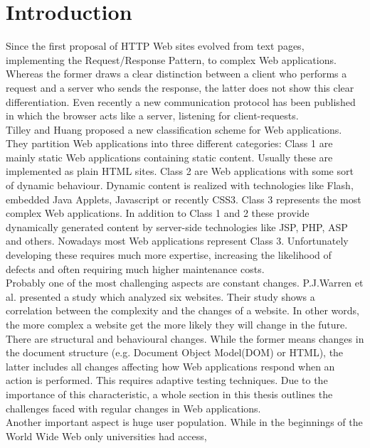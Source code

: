 \documentclass[12pt, notitlepage]{article}
\begin{document}
\section*{Introduction}
Since the first proposal of HTTP\cite{http-proposal} Web sites evolved from 
text pages, implementing the Request/Response Pattern\cite{request-response}, to  
complex Web applications. Whereas the former draws a clear distinction between a client
who performs a request and a server who sends the response, the latter does not show this 
clear differentiation. Even recently a new communication protocol\cite{web-socket} has been published 
in which the browser acts like a server, listening for client-requests.\\
Tilley and Huang\cite{web-classification} proposed
a new classification scheme for Web applications. They partition Web applications into three different categories:
Class 1 are mainly static Web applications containing static content. Usually these are implemented as plain HTML sites. 
Class 2 are Web applications with some sort of dynamic behaviour. Dynamic content is realized with technologies like Flash\cite{flash},
embedded Java Applets\cite{java-applet}, Javascript or recently CSS3\cite{css3}. 
Class 3 represents the most complex Web applications. In addition to Class 1 and 2 these provide dynamically generated content by server-side technologies
like JSP, PHP, ASP and others. Nowadays most Web applications represent Class 3. Unfortunately developing these requires much more expertise, increasing the
likelihood of defects and often requiring much higher maintenance costs.\\
Probably one of the most challenging aspects are constant changes. P.J.Warren et al.\cite{html-evolution}
presented a study which analyzed six websites. Their study shows a correlation between the complexity and the changes of
a website. In other words, the more complex a website get the more likely they will change in the future. 
There are structural and behavioural changes. While the former means changes in the document structure (e.g. Document Object Model(DOM)\cite{dom} or HTML), the latter
includes all changes affecting how Web applications respond when an action is performed. 
This requires adaptive testing techniques. Due to the importance of this characteristic, a whole section in this thesis outlines the challenges faced
with regular changes in Web applications.\\ 
Another important aspect is huge user population. While in the beginnings of the World Wide Web only universities had access,
\end{document}
